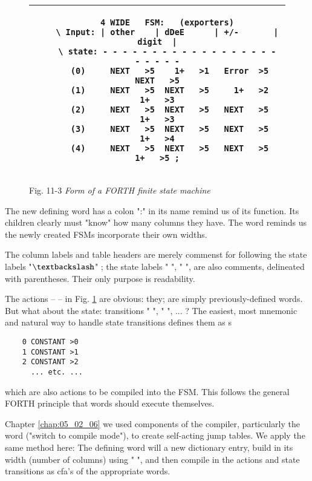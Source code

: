 \begin{figure}[H]
    \begin{tabular}{|c|}
        \hline
        \begin{lstlisting}
    4 WIDE   FSM:   (exporters)
    \ Input: | other    | dDeE      | +/-       | digit  |
    \ state: - - - - - - - - - - - - - - - - - - - - - - -
     (0)     NEXT   >5    1+   >1   Error  >5   NEXT   >5
     (1)     NEXT   >5  NEXT   >5     1+   >2     1+   >3
     (2)     NEXT   >5  NEXT   >5   NEXT   >5     1+   >3
     (3)     NEXT   >5  NEXT   >5   NEXT   >5     1+   >4
     (4)     NEXT   >5  NEXT   >5   NEXT   >5     1+   >5 ;
        \end{lstlisting} \\
        \hline
    \end{tabular}
    \caption{Fig. 11-3 \textit{Form of a FORTH finite state machine}}
    \label{fig:11_03}
\end{figure}

The new defining word  has a colon ":" in its name remind us of its function. Its children clearly must "know" how many columns they have. The word  reminds us the newly created FSMs incorporate their own widths.

The column labels and table headers are merely commenst for following the state labels "$\textbackslash$" ; the state labels "  ", "  ", \etc are also comments, delineated with parentheses. Their only purpose is readability.

The actions --  -- in Fig. \ref{fig:11_03} are obvious: they; are simply previously-defined words. But what about the state: transitions "  ", "  ", ... ? The easiest, most mnemonic and natural way to handle state transitions defines them as s

\begin{lstlisting}
    0 CONSTANT >0
    1 CONSTANT >1
    2 CONSTANT >2
      ... etc. ...
\end{lstlisting}

which are also actions to be compiled into the FSM. This follows the general FORTH principle that words should execute themselves.

 Chapter \ref{chap:05_02_06} we used components of the compiler, particularly the  word \bc{]} ("switch to compile mode"), to create self-acting jump tables. We apply the same method here: The defining word  will  a new dictionary entry, build in its width (number of columns) using " \bc{,} ", and then compile in the actions and state transitions as cfa’s of the appropriate words.

